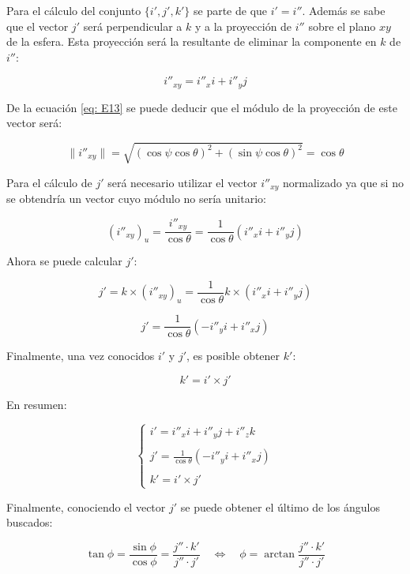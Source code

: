 \documentclass[12pt, a4paper]{report}
\begin{document}
Para el cálculo del conjunto $\{i', j', k'\}$ se parte de que $i' = i''$. Además se sabe que el vector $j'$ será perpendicular a $k$ y a la proyección de $i''$ sobre el plano $xy$ de la esfera. Esta proyección será la resultante de eliminar la componente en $k$ de $i''$:

$$ i''_{xy} = i''_x i + i''_y j $$

De la ecuación \eqref{eq: E13} se puede deducir que el módulo de la proyección de este vector será:

$$ \|i''_{xy}\| = \sqrt{\left(\cos \psi \cos \theta\right)^2 + \left(\sin \psi \cos \theta \right)^2} = \cos\theta$$

Para el cálculo de $j'$ será necesario utilizar el vector $i''_{xy}$ normalizado ya que si no se obtendría un vector cuyo módulo no sería unitario: 

$$ \left( i''_{xy} \right)_u = \frac{i''_{xy}}{\cos\theta} = \frac{1}{\cos\theta}\left( i''_x i + i''_y j \right) $$

Ahora se puede calcular $j'$:

$$ j' = k \times \left( i''_{xy} \right)_u = \frac{1}{\cos\theta} k \times\left( i''_x i + i''_y j \right) $$

\begin{equation}
j' = \frac{1}{\cos\theta} \left( - i''_y i + i''_x j \right)
\end{equation}
  
Finalmente, una vez conocidos $i'$ y $j'$, es posible obtener $k'$:

$$ k' = i' \times j' $$

En resumen:

\begin{equation}
\begin{cases}
i' = i''_x i + i''_y j + i''_z k \\
\\
j' = \displaystyle\frac{1}{\cos\theta} \left( - i''_y i + i''_x j \right) \\
\\
k' = i' \times j'
\end{cases}
\end{equation}

Finalmente, conociendo el vector $j'$ se puede obtener el último de los ángulos buscados:

\begin{equation}
\tan\phi = \frac{\sin \phi}{\cos \phi} = \frac{j'' \cdot k'}{j'' \cdot j'} \quad \iff \quad \phi = \arctan \frac{j'' \cdot k'}{j'' \cdot j'}
\end{equation}
\end{document}
